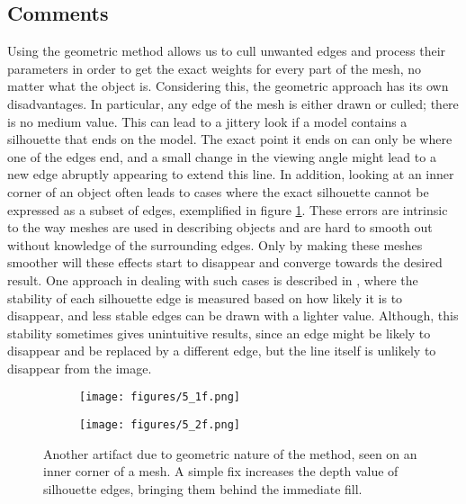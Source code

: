 \documentclass[a4paper, 12pt]{article}
\begin{document}
\subsection{Comments}
Using the geometric method allows us to cull unwanted edges and process their parameters in order to get the exact weights for every part of the mesh, no matter what the object is. Considering this, the geometric approach has its own disadvantages. In particular, any edge of the mesh is either drawn or culled; there is no medium value. This can lead to a jittery look if a model contains a silhouette that ends on the model. The exact point it ends on can only be where one of the edges end, and a small change in the viewing angle might lead to a new edge abruptly appearing to extend this line. In addition, looking at an inner corner of an object often leads to cases where the exact silhouette cannot be expressed as a subset of edges, exemplified in figure \ref{inner}. These errors are intrinsic to the way meshes are used in describing objects and are hard to smooth out without knowledge of the surrounding edges. Only by making these meshes smoother will these effects start to disappear and converge towards the desired result. One approach in dealing with such cases is described in \cite{Brosz2004}, where the stability of each silhouette edge is measured based on how likely it is to disappear, and less stable edges can be drawn with a lighter value. Although, this stability sometimes gives unintuitive results, since an edge might be likely to disappear and be replaced by a different edge, but the line itself is unlikely to disappear from the image.

\begin{figure}[htbp!]
  \centering
  \begin{subfigure}{0.3\columnwidth}
    \texttt{[image: figures/5\_1f.png]}
  \end{subfigure}
  \begin{subfigure}{0.3\columnwidth}
    \texttt{[image: figures/5\_2f.png]}
  \end{subfigure}
  \caption{Another artifact due to geometric nature of the method, seen on an inner corner of a mesh. A simple fix increases the depth value of silhouette edges, bringing them behind the immediate fill.}
  \label{inner}
\end{figure}
\end{document}
